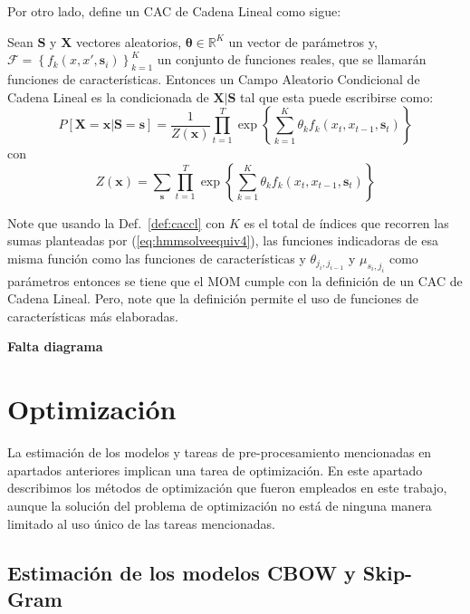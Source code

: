 Por otro lado, \cite{sutton2019introduction} define un CAC de Cadena Lineal como sigue:

\begin{defi}
	\label{def:caccl}
	Sean $\mathbf{S}$ y $\mathbf{X}$ vectores aleatorios, $\mathbf{\theta} \in \mathbb{R}^K$ un vector de parámetros y, $\mathcal{F} = \left\lbrace f_{k}(x,x',\mathbf{s}_i)\right\rbrace_{k=1}^K$ un conjunto de funciones reales, que se llamarán funciones de características. Entonces un Campo Aleatorio Condicional de Cadena Lineal es la condicionada de $\mathbf{X}\vert \mathbf{S}$ tal que esta puede escribirse como:
	\begin{equation}
		P[\mathbf{X}=\mathbf{x}| \mathbf{S}=\mathbf{s}] = \frac{1}{Z(\mathbf{x})}\prod_{t=1}^{T}\exp \left\lbrace \sum_{k=1}^{K}\theta_k f_k\left(x_t,x_{t-1},\mathbf{s}_t\right)\right\rbrace
	\end{equation}
	con
	\begin{equation}
		Z\left(\mathbf{x}\right) = \sum_{\mathbf{s}}\prod_{t=1}^{T}\exp \left\lbrace \sum_{k=1}^{K}\theta_k f_k\left(x_t,x_{t-1},\mathbf{s}_t\right)\right\rbrace
	\end{equation}
\end{defi}

Note que usando la Def.~\ref{def:caccl} con $K$ es el total de índices que recorren las sumas planteadas por (\ref{eq:hmmsolveequiv4}), las funciones indicadoras de esa misma función como las funciones de características y $\theta_{j_i,j_{i-1}}$ y $\mu_{s_i,j_i}$ como parámetros entonces se tiene que el MOM cumple con la definición de un CAC de Cadena Lineal. Pero, note que la definición permite el uso de funciones de características más elaboradas.

\textbf{Falta diagrama}

\section{Optimización}

La estimación de los modelos y tareas de pre-procesamiento mencionadas en apartados anteriores implican una tarea de optimización. En este apartado describimos los métodos de optimización que fueron empleados en este trabajo, aunque la solución del problema de optimización no está de ninguna manera limitado al uso único de las tareas mencionadas.

\subsection{Estimación de los modelos CBOW y Skip-Gram}

